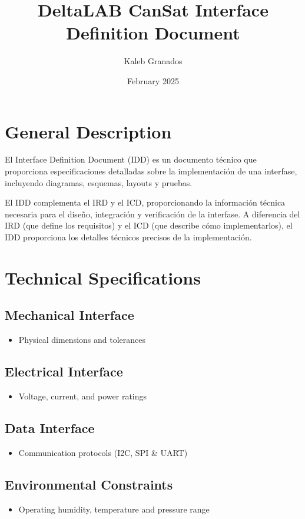 \documentclass{article}
\title{DeltaLAB CanSat Interface Definition Document}
\author{Kaleb Granados}
\date{February 2025}
\begin{document}
\maketitle
\newpage

\section{General Description}

El Interface Definition Document (IDD) es un documento técnico que proporciona especificaciones detalladas sobre la implementación de una interfase, incluyendo diagramas, esquemas, layouts y pruebas.

El IDD complementa el IRD y el ICD, proporcionando la información técnica necesaria para el diseño, integración y verificación de la interfase. A diferencia del IRD (que define los requisitos) y el ICD (que describe cómo implementarlos), el IDD proporciona los detalles técnicos precisos de la implementación.

\section{Technical Specifications}

\subsection{Mechanical Interface}
\begin{itemize}
    \item Physical dimensions and tolerances
\end{itemize}

\subsection{Electrical Interface}
\begin{itemize}
    \item Voltage, current, and power ratings
\end{itemize}

\subsection{Data Interface}
\begin{itemize}
    \item Communication protocols (I2C, SPI & UART)
\end{itemize}

\subsection{Environmental Constraints}
\begin{itemize}
    \item Operating humidity, temperature and pressure range
\end{itemize}
\end{document}
